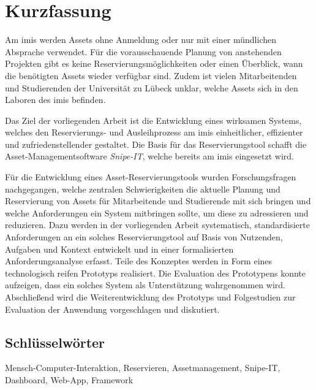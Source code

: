 
\cleardoublepage
\thispagestyle{plain}

\section*{Kurzfassung}

Am \ac{imis} werden Assets ohne Anmeldung oder nur mit einer mündlichen
Absprache verwendet. Für die vorausschauende Planung von anstehenden Projekten
gibt es keine Reservierungsmöglichkeiten oder einen Überblick, wann die
benötigten Assets wieder verfügbar sind. Zudem ist vielen Mitarbeitenden und
Studierenden der Universität zu Lübeck unklar, welche Assets sich in den Laboren
des \ac{imis} befinden.

Das Ziel der vorliegenden Arbeit ist die Entwicklung eines wirksamen Systems,
welches den Reservierungs- und Ausleihprozess am \ac{imis} einheitlicher,
effizienter und zufriedenstellender gestaltet. Die Basis für das
Reservierungstool schafft die Asset-Managementsoftware \textit{Snipe-IT}, welche
bereits am \ac{imis} eingesetzt wird.

Für die Entwicklung eines Asset-Reservierungstools wurden Forschungsfragen
nachgegangen, welche zentralen Schwierigkeiten die aktuelle Planung und
Reservierung von Assets für Mitarbeitende und Studierende mit sich bringen und
welche Anforderungen ein System mitbringen sollte, um diese zu adressieren und
reduzieren. Dazu werden in der vorliegenden Arbeit systematisch, standardisierte
Anforderungen an ein solches Reservierungstool auf Basis von Nutzenden, Aufgaben
und Kontext entwickelt und in einer formalisierten Anforderungsanalyse erfasst.
Teile des Konzeptes werden in Form eines technologisch reifen Prototyps
realisiert. Die Evaluation des Prototypens konnte aufzeigen, dass ein solches
System als Unterstützung wahrgenommen wird. Abschließend wird die
Weiterentwicklung des Prototyps und Folgestudien zur Evaluation der Anwendung
vorgeschlagen und diskutiert.

\subsection*{Schlüsselwörter}
Mensch-Computer-Interaktion, Reservieren, Assetmanagement, Snipe-IT, Dashboard,
Web-App, Framework

\cleardoublepage
\thispagestyle{plain}


